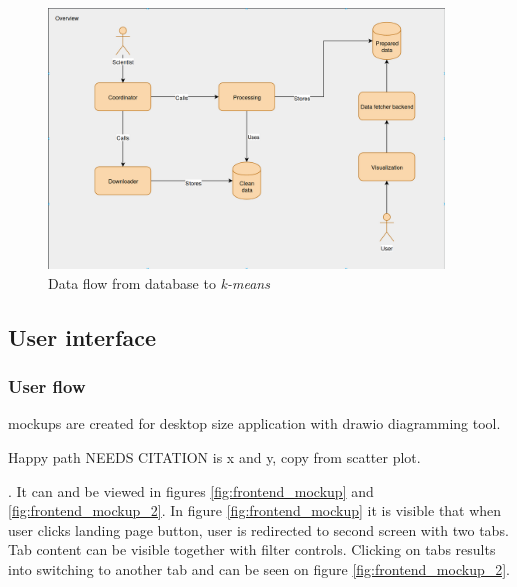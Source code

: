 \documentclass[a4paper,12pt]{article}
\begin{document}
      	\begin{figure}[H]	
	    	\centering
	    	\includegraphics[width=10.5cm]{images/data_flow_overview.png}
	    	\caption{Data flow from database to \textit{k-means}}
	    	\label{fig:data_flow_pipeline}
  		\end{figure}
		
		    \vspace{1cm}
		    
	\clearpage
	
	\subsection{User interface}
	
	\subsubsection{User flow}
	
	\glspl{mockup} are created for desktop size application with \gls{drawio} diagramming tool.
	
	Happy path NEEDS CITATION is x and y, copy from scatter plot.
	
	. It can and be viewed in figures \ref{fig:frontend_mockup} and \ref{fig:frontend_mockup_2}. In figure \ref{fig:frontend_mockup} it is visible that  when user clicks landing page button, user is redirected to second screen with two tabs. Tab content can be visible together with filter controls. Clicking on tabs results into switching to another tab and can be seen on figure \ref{fig:frontend_mockup_2}.
	
\end{document}
